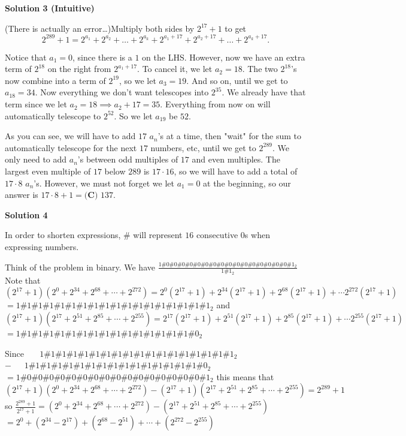 \begin{enumerate}
\textbf{Solution 3 (Intuitive)}

(There is actually an error\ldots)Multiply both sides by $2^{17}+1$ to get 
 \[2^{289}+1=2^{a_1} + 2^{a_2} + \ldots + 2^{a_k} + 2^{a_1+17} + 2^{a_2+17} + \ldots + 2^{a_k+17}.\]

 Notice that $a_1 = 0$, since there is a $1$ on the LHS. However, now we have an extra term of $2^{18}$ on the right from $2^{a_1+17}$. To cancel it, we let $a_2 = 18$. The two $2^{18}$'s now combine into a term of $2^{19}$, so we let $a_3 = 19$. And so on, until we get to $a_{18} = 34$. Now everything we don't want telescopes into $2^{35}$. We already have that term since we let $a_2 = 18 \implies a_2+17 = 35$. Everything from now on will automatically telescope to $2^{52}$. So we let $a_{19}$ be $52$.

 As you can see, we will have to add $17$ $a_n$'s at a time, then "wait" for the sum to automatically telescope for the next $17$ numbers, etc, until we get to $2^{289}$. We only need to add $a_n$'s between odd multiples of $17$ and even multiples. The largest even multiple of $17$ below $289$ is $17\cdot16$, so we will have to add a total of $17\cdot 8$ $a_n$'s. However, we must not forget we let $a_1=0$ at the beginning, so our answer is $17\cdot8+1 = \boxed{\textbf{(C) } 137}$.

 



\textbf{Solution 4}

In order to shorten expressions, $\#$ will represent $16$ consecutive $0$s when expressing numbers. 

Think of the problem in binary. We have 
$\frac{1\#0\#0\#0\#0\#0\#0\#0\#0\#0\#0\#0\#0\#0\#0\#0\#0\#1_2}{1\#1_2}$ 
Note that 
$(2^{17} + 1) (2^0 + 2^{34} + 2^{68} + \cdots + 2^{272}) = 2^0(2^{17} + 1) + 2^{34}(2^{17} + 1) + 2^{68}(2^{17} + 1) + \cdots 2^{272}(2^{17} + 1)$
$= 1\#1\#1\#1\#1\#1\#1\#1\#1\#1\#1\#1\#1\#1\#1\#1\#1\#1_2$ 
and 
$(2^{17} + 1) (2^{17} + 2^{51} + 2^{85} + \cdots + 2^{255}) = 2^{17}(2^{17} + 1) + 2^{51}(2^{17} + 1) + 2^{85}(2^{17} + 1) + \cdots 2^{255}(2^{17} + 1)$
$= 1\#1\#1\#1\#1\#1\#1\#1\#1\#1\#1\#1\#1\#1\#1\#1\#0_2$ 

Since 
$\phantom{=\ } 1\#1\#1\#1\#1\#1\#1\#1\#1\#1\#1\#1\#1\#1\#1\#1\#1\#1_2$
$-\ \phantom{1\#} 1\#1\#1\#1\#1\#1\#1\#1\#1\#1\#1\#1\#1\#1\#1\#1\#0_2$
$= 1\#0\#0\#0\#0\#0\#0\#0\#0\#0\#0\#0\#0\#0\#0\#0\#0\#1_2$ 
this means that
$(2^{17} + 1) (2^0 + 2^{34} + 2^{68} + \cdots + 2^{272}) - (2^{17} + 1) (2^{17} + 2^{51} + 2^{85} + \cdots + 2^{255}) = 2^{289} + 1$
so 
$\frac{2^{289}+1}{2^{17}+1} = (2^0 + 2^{34} + 2^{68} + \cdots + 2^{272}) - (2^{17} + 2^{51} + 2^{85} + \cdots + 2^{255})$
$= 2^0 + (2^{34} - 2^{17}) + (2^{68} - 2^{51}) + \cdots + (2^{272} - 2^{255})$ 


\end{enumerate}
